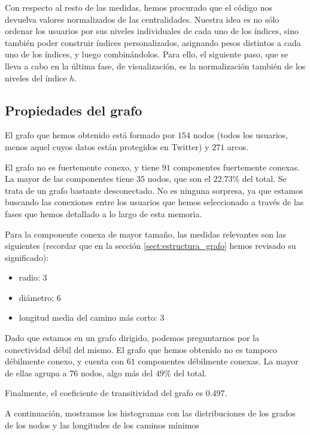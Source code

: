 Con respecto al resto de las medidas, hemos procurado que el código nos
devuelva valores normalizados de las centralidades. Nuestra idea es no sólo ordenar
los usuarios por sus niveles individuales de cada uno de los índices, sino también
poder construir índices personalizados, asignando pesos distintos a cada uno de los 
índices, y luego combinándolos. Para ello, el siguiente paso, que se lleva a cabo en
la última fase, de visualización, es la normalización también de los niveles 
del índice $h$. 

\subsection{Propiedades del grafo}
El grafo que hemos obtenido está formado por $154$ nodos (todos los usuarios, menos
aquel cuyos datos están protegidos en Twitter) y $271$ arcos.

El grafo no es fuertemente conexo, y tiene $91$ componentes fuertemente conexas.
La mayor de las componentes tiene $35$ nodos, que son el $22.73$\% del total.
Se trata de un grafo bastante desconectado. No es ninguna sorpresa, ya que 
estamos buscando las conexiones entre los usuarios que hemos seleccionado 
a través de las fases que hemos detallado a lo largo de esta memoria.

Para la componente conexa de mayor tamaño, las medidas 
relevantes son las siguientes (recordar que en la sección \ref{sect:estructura_grafo} hemos
revisado su significado):   
\begin{itemize}
\item radio: $3$
\item diámetro: $6$
\item longitud media del camino más corto: $3$
\end{itemize}
Dado que estamos en un grafo dirigido, podemos preguntarnos por la conectividad débil
del mismo. El grafo que hemos obtenido no es tampoco débilmente conexo, y cuenta
con $61$ componentes débilmente conexas. La mayor de ellas agrupa a $76$ nodos, algo más del
$49$\% del total.

Finalmente, el coeficiente de transitividad del grafo es $0.497$.

A continuación, mostramos los histogramas con las distribuciones
de los grados de los nodos y las longitudes de los caminos mínimos


